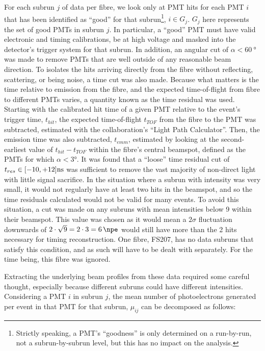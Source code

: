 For each subrun $j$ of data per fibre, we look only at PMT hits for each PMT $i$ that has been identified as ``good'' for that subrun\footnote{Strictly speaking, a PMT's ``goodness'' is only determined on a run-by-run, not a subrun-by-subrun level, but this has no impact on the analysis.}, $i \in G_{j}$. $G_{j}$ here represents the set of good PMTs in subrun $j$. In particular, a ``good'' PMT must have valid electronic and timing calibrations, be at high voltage and masked into the detector's trigger system for that subrun. In addition, an angular cut of $\alpha < \SI{60}{\degree}$ was made to remove PMTs that are well outside of any reasonable beam direction. To isolates the hits arriving directly from the fibre without reflecting, scattering, or being noise, a time cut was also made. Because what matters is the time relative to emission from the fibre, and the expected time-of-flight from fibre to different PMTs varies, a quantity known as the time residual was used. Starting with the calibrated hit time of a given PMT relative to the event's trigger time, $t_{hit}$, the expected time-of-flight $t_{TOF}$ from the fibre to the PMT was subtracted, estimated with the collaboration's ``Light Path Calculator''. Then, the emission time was also subtracted, $t_{emm}$, estimated by looking at the second-earliest value of $t_{hit}-t_{TOF}$ within the fibre's central beamspot, defined as the PMTs for which $\alpha<\ang{3}$. It was found that a ``loose'' time residual cut of $t_{res} \in [-10, +12] \si[]{\nano\second}$ was sufficient to remove the vast majority of non-direct light with little signal sacrifice. In the situation where a subrun with intensity was very small, it would not regularly have at least two hits in the beamspot, and so the time residuals calculated would not be valid for many events. To avoid this situation, a cut was made on any subruns with mean intensities below 9 within their beamspot. This value was chosen as it would mean a $2\sigma$ fluctuation downwards of $2\cdot\sqrt{9}=2\cdot3=\SI{6}{\npe}$ would still have more than the 2 hits necessary for timing reconstruction. One fibre, FS207, has no data subruns that satisfy this condition, and as such will have to be dealt with separately. For the time being, this fibre was ignored.

Extracting the underlying beam profiles from these data required some careful thought, especially because different subruns could have different intensities. Considering a PMT $i$ in subrun $j$, the mean number of photoelectrons generated per event in that PMT for that subrun, $\mu_{ij}$ can be decomposed as follows:

